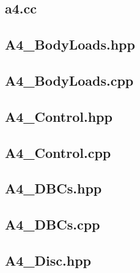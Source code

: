 \documentclass[a4paper, 12pt]{article}
\begin{document}
\subsection{a4.cc} \label{subsec:a4.cc}


\newpage
\subsection{A4\_BodyLoads.hpp} \label{subsec:BLhpp}


\newpage
\subsection{A4\_BodyLoads.cpp} \label{subsec:BLcpp}


\newpage
\subsection{A4\_Control.hpp} \label{subsec:Cont.hpp}


\newpage
\subsection{A4\_Control.cpp} \label{subsec:Cont.cpp}


\newpage
\subsection{A4\_DBCs.hpp} \label{subsec:DBCs.hpp}


\newpage
\subsection{A4\_DBCs.cpp} \label{subsec:DBCs.cpp}


\newpage
\subsection{A4\_Disc.hpp} \label{subsec:Disc.hpp}

\end{document}
